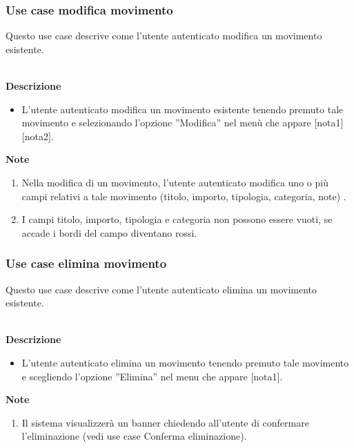 \documentclass[a4paper,12pt]{article}
\begin{document}
\subsubsection*{Use case modifica movimento}

Questo use case descrive come l'utente autenticato modifica un movimento esistente.

\textbf{\\Descrizione}
\begin{itemize} \setlength\itemsep{0.01em}
\item L'utente autenticato modifica un movimento esistente tenendo premuto tale movimento e selezionando l'opzione ''Modifica'' nel menù che appare [nota1] [nota2].
\end{itemize}

\textbf{Note}
\begin{enumerate} \setlength\itemsep{0.01em}
\item Nella modifica di un movimento, l'utente autenticato modifica uno o più campi relativi a tale movimento (titolo, importo, tipologia, categoria, note) .
\item I campi titolo, importo, tipologia e categoria non possono essere vuoti, se accade i bordi del campo diventano rossi.
\end{enumerate}



\subsubsection*{Use case elimina movimento}

Questo use case descrive come l'utente autenticato elimina un movimento esistente.

\textbf{\\Descrizione}
\begin{itemize} \setlength\itemsep{0.01em}
\item L'utente autenticato elimina un movimento tenendo premuto tale movimento e scegliendo l'opzione ''Elimina'' nel menu che appare [nota1].
\end{itemize}

\textbf{Note}
\begin{enumerate} \setlength\itemsep{0.01em}
\item Il sistema visualizzerà un banner chiedendo all'utente di confermare l'eliminazione  (vedi use case Conferma eliminazione).
\end{enumerate}
\end{document}
